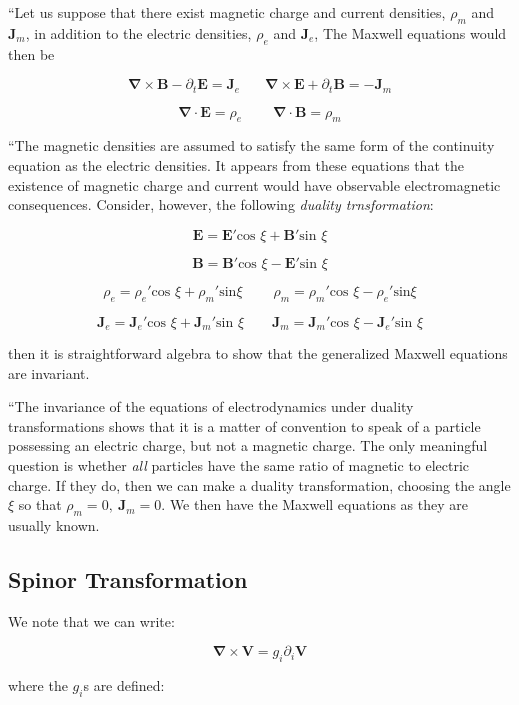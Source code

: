 \documentclass {article}
\renewcommand\vec{\mathbf}
\let\OldS\nabla
\renewcommand{\nabla}{\boldsymbol{\OldS}}
\begin{document}
``Let us suppose that there exist magnetic charge and current densities, $\rho_m$ and $\vec J_m$, in addition  to the electric densities, $\rho_e$ and $\vec J_e$, The Maxwell equations would then be

$$\nabla \times \vec B  - \partial_t \vec E  = \vec J_e  ~~~~~~~~ \nabla \times \vec E + \partial_t \vec B =  - \vec J_m   $$

$$\nabla \cdot \vec E = \rho_e ~~~~~~~~~~ \nabla \cdot \vec B =  \rho_m $$

``The magnetic densities are assumed to satisfy the same form of the continuity equation as the electric densities. It appears from these equations that the existence of magnetic charge and current would have observable electromagnetic consequences. Consider, however, the following \textit{duality trnsformation}:

$$\vec E = \vec E' \text{cos } \xi + \vec B'  \text{sin } \xi$$

$$\vec B = \vec B' \text{cos } \xi - \vec E'  \text{sin } \xi$$

$$\rho_e = \rho_e'  \text{cos } \xi  + \rho_m'  \text{sin} \xi  ~~~~~~~~~~ \rho_m = \rho_m'  \text{cos } \xi  - \rho_e'  \text{sin} \xi $$

$$\vec J_e = \vec J_e' \text{cos } \xi + \vec J_m' \text{sin } \xi ~~~~~~~~~ \vec J_m = \vec J_m' \text{cos } \xi  - \vec J_e' \text{sin } \xi $$

\noindent then it is straightforward algebra to show that the generalized Maxwell equations are invariant.

``The invariance of the equations of electrodynamics under duality transformations shows that it is a matter of convention to speak of a particle possessing an electric charge, but not a magnetic charge. The only meaningful question is whether \textit{all} particles have the same ratio of magnetic to electric charge. If they do, then we can make a duality transformation, choosing the angle $\xi$ so that $\rho_m = 0, ~ \vec J_m = 0$. We then have the Maxwell equations as they are usually known.

\newpage

\subsection{Spinor Transformation}

We note that we can write:

$$\nabla \times \vec V = g_i \partial_i \vec V $$

where the $g_i$s are defined:
\end{document}
